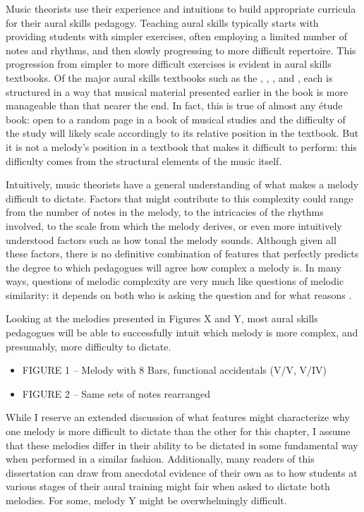 \documentclass[]{book}
\begin{document}
Music theorists use their experience and intuitions to build appropriate curricula for their aural skills pedagogy.
Teaching aural skills typically starts with providing students with simpler exercises, often employing a limited number of notes and rhythms, and then slowly progressing to more difficult repertoire.
This progression from simpler to more difficult exercises is evident in aural skills textbooks.
Of the major aural skills textbooks such as the \citet{ottmanMusicSightSinging2014}, \citet{berkowitzNewApproachSight2011}, \citet{karpinskiManualEarTraining2007}, and \citet{clelandDevelopingMusicianshipAural2010}, each is structured in a way that musical material presented earlier in the book is more manageable than that nearer the end.
In fact, this is true of almost any étude book: open to a random page in a book of musical studies and the difficulty of the study will likely scale accordingly to its relative position in the textbook.
But it is not a melody's position in a textbook that makes it difficult to perform: this difficulty comes from the structural elements of the music itself.

Intuitively, music theorists have a general understanding of what makes a melody difficult to dictate.
Factors that might contribute to this complexity could range from the number of notes in the melody, to the intricacies of the rhythms involved, to the scale from which the melody derives, or even more intuitively understood factors such as how tonal the melody sounds.
Although given all these factors, there is no definitive combination of features that perfectly predicts the degree to which pedagogues will agree how complex a melody is.
In many ways, questions of melodic complexity are very much like questions of melodic similarity: it depends on both who is asking the question and for what reasons \citep{cambouropoulosHowSimilarSimilar2009}.

Looking at the melodies presented in Figures X and Y, most aural skills pedagogues will be able to successfully intuit which melody is more complex, and presumably, more difficulty to dictate.

\begin{itemize}
\item
  FIGURE 1 -- Melody with 8 Bars, functional accidentals (V/V, V/IV)
\item
  FIGURE 2 -- Same sets of notes rearranged
\end{itemize}

While I reserve an extended discussion of what features might characterize why one melody is more difficult to dictate than the other for this chapter, I assume that these melodies differ in their ability to be dictated in some fundamental way when performed in a similar fashion.
Additionally, many readers of this dissertation can draw from anecdotal evidence of their own as to how students at various stages of their aural training might fair when asked to dictate both melodies.
For some, melody Y might be overwhelmingly difficult.
\end{document}
